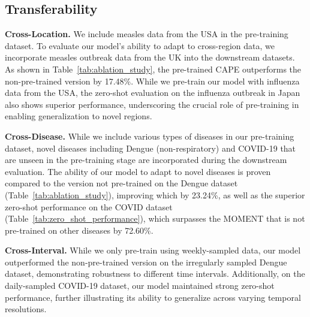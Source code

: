 \subsection{Transferability}
\textbf{Cross-Location.} 
We include measles data from the USA in the pre-training dataset. To evaluate our model's ability to adapt to cross-region data, we incorporate measles outbreak data from the UK into the downstream datasets. As shown in Table~\ref{tab:ablation_study}, the pre-trained CAPE outperforms the non-pre-trained version by 17.48\%. While we pre-train our model with influenza data from the USA, the zero-shot evaluation on the influenza outbreak in Japan also shows superior performance, underscoring the crucial role of pre-training in enabling generalization to novel regions.

\textbf{Cross-Disease.} 
While we include various types of diseases in our pre-training dataset, novel diseases including Dengue (non-respiratory) and COVID-19 that are unseen in the pre-training stage are incorporated during the downstream evaluation. The ability of our model to adapt to novel diseases is proven compared to the version not pre-trained on the Dengue dataset (Table~\ref{tab:ablation_study}), improving which by 23.24\%, as well as the superior zero-shot performance on the COVID dataset (Table~\ref{tab:zero_shot_performance}), which surpasses the MOMENT that is not pre-trained on other diseases by 72.60\%.

\textbf{Cross-Interval.} 
While we only pre-train using weekly-sampled data, our model outperformed the non-pre-trained version on the irregularly sampled Dengue dataset, demonstrating robustness to different time intervals. Additionally, on the daily-sampled COVID-19 dataset, our model maintained strong zero-shot performance, further illustrating its ability to generalize across varying temporal resolutions.



